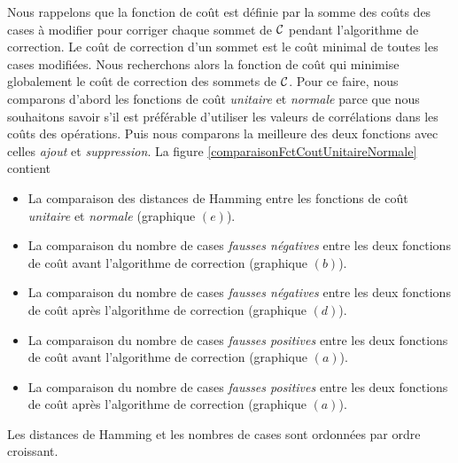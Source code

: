 
Nous rappelons que la fonction de co\^ut est d\'efinie par la somme des co\^uts des cases \`a modifier pour corriger chaque sommet de $\cal C$ pendant l'algorithme de correction. 
Le co\^ut de correction d'un sommet est le co\^ut minimal de toutes les cases modifi\'ees. 
Nous recherchons alors la fonction de co\^ut qui minimise globalement le co\^ut de correction des sommets de $\cal C$.
Pour ce faire, nous comparons d'abord les fonctions de co\^ut {\em unitaire} et {\em normale} parce que nous souhaitons savoir s'il est pr\'ef\'erable d'utiliser les valeurs de corr\'elations dans les co\^uts des op\'erations. Puis nous comparons la meilleure des deux fonctions avec celles {\em ajout} et {\em suppression}.
La figure \ref{comparaisonFctCoutUnitaireNormale} contient 
\begin{itemize}
	\item La comparaison des distances de Hamming entre les  fonctions de co\^ut {\em unitaire} et {\em normale} (graphique $(e)$).
	\item La comparaison du nombre de cases {\em fausses n\'egatives} entre les deux fonctions de co\^ut avant l'algorithme de correction (graphique $(b)$).
	\item  La comparaison du nombre de cases {\em fausses n\'egatives} entre les deux fonctions de co\^ut apr\`es l'algorithme de correction (graphique $(d)$).
	\item La comparaison du nombre de cases {\em fausses positives} entre les deux fonctions de co\^ut avant l'algorithme de correction (graphique $(a)$).
	\item  La comparaison du nombre de cases {\em fausses positives} entre les deux fonctions de co\^ut apr\`es l'algorithme de correction (graphique $(a)$).
\end{itemize}
Les distances de Hamming et les nombres de cases sont ordonn\'ees par ordre croissant.

